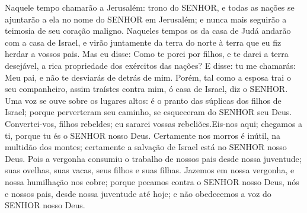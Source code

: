 {Naquele tempo chamarão a Jerusalém: trono do SENHOR, e todas as nações se ajuntarão a ela no nome do SENHOR em Jerusalém; e nunca mais seguirão a teimosia de seu coração maligno.
Naqueles tempos os da casa de Judá andarão com a casa de Israel, e virão juntamente da terra do norte à terra que eu fiz herdar a vossos pais.
Mas eu disse: Como te porei por filhos, e te darei a terra desejável, a rica propriedade dos exércitos das nações? E disse: tu me chamarás: Meu pai, e não te desviarás de detrás de mim.
Porém, tal como a esposa trai o seu companheiro, assim traístes contra mim, ó casa de Israel, diz o SENHOR.
Uma voz se ouve sobre os lugares altos: é o pranto das súplicas dos filhos de Israel; porque perverteram seu caminho,
{} se esqueceram do SENHOR seu Deus.
Convertei-vos, filhos rebeldes; eu sararei vossas rebeliões.Eis-nos aqui; chegamos a ti, porque tu és o SENHOR nosso Deus.
Certamente
{} nos morros é inútil, na multidão dos montes; certamente a salvação de Israel está no SENHOR nosso Deus.
Pois a vergonha consumiu o trabalho de nossos pais desde nossa juventude; suas ovelhas, suas vacas, seus filhos e suas filhas.
Jazemos em nossa vergonha, e nossa humilhação nos cobre; porque pecamos contra o SENHOR nosso Deus, nós e nossos pais, desde nossa juventude até hoje; e não obedecemos
 a voz do SENHOR nosso Deus.

\par }

